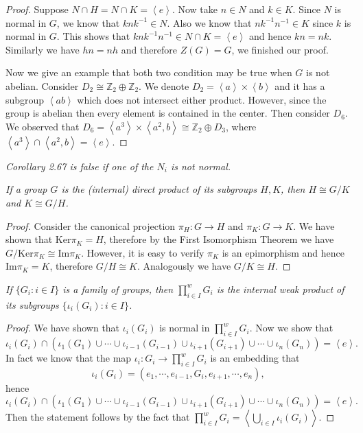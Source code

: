 \begin{proof}
Suppose $N\cap H=N\cap K=\left<e\right>$. Now take $n\in N$ and $k\in K$. Since $N$ is normal in $G$, we know that $knk^{-1}\in N$. Also we know that $nk^{-1}n^{-1}\in K$ since $k$ is normal in $G$. This shows that $knk^{-1}n^{-1}\in N\cap K=\left<e\right>$ and hence $kn=nk$. Similarly we have $hn=nh$ and therefore $Z(G)=G$, we finished our proof.\par
Now we give an example that both two condition may be true when $G$ is not abelian. Consider $D_2\cong\mathbb{Z}_2\oplus\mathbb{Z}_2$. We denote $D_2=\left<a\right>\times\left<b\right>$ and it has a subgroup $\left<ab\right>$ which does not intersect either product. However, since the group is abelian then every element is contained in the center. Then consider $D_6$. We observed that $D_6=\left<a^3\right>\times\left<a^2,b\right>\cong\mathbb{Z}_2\oplus D_3$, where $\left<a^3\right>\cap\left<a^2,b\right>=\left<e\right>$.
\end{proof}
\begin{problem}\em
Corollary 2.67 is false if one of the $N_i$ is not normal.
\end{problem}
\begin{problem}\em
If a group $G$ is the (internal) direct product of its subgroups $H,K$, then $H\cong G/K$ and $K\cong G/H$.
\end{problem}
\begin{proof}
Consider the canonical projection $\pi_H:G\to H$ and $\pi_K:G\to K$. We have shown that $\mathrm{Ker}\pi_K=H$, therefore by the First Isomorphism Theorem we have $G/\mathrm{Ker}\pi_K\cong\mathrm{Im}\pi_K$. However, it is easy to verify $\pi_K$ is an epimorphism and hence $\mathrm{Im}\pi_K=K$, therefore $G/H\cong K$. Analogously we have $G/K\cong H$.
\end{proof}
\begin{problem}\em
If $\{G_i:i\in I\}$ is a family of groups, then ${\prod}^w_{i\in I}G_i$ is the internal weak product of its subgroups $\{\iota_i(G_i):i\in I\}$.
\end{problem}
\begin{proof}
We have shown that $\iota_i(G_i)$ is normal in ${\prod}^w_{i\in I}G_i$. Now we show that 
$$
\iota _i\left( G_i \right) \cap \left( \iota _1\left( G_1 \right) \cup \cdots \cup \iota _{i-1}\left( G_{i-1} \right) \cup \iota _{i+1}\left( G_{i+1} \right) \cup \cdots \cup \iota _n\left( G_n \right) \right) =\left< e \right> .
$$
In fact we know that the map $\iota _i:G_i\rightarrow {\prod}^w_{i\in I}{G_i}$ is an embedding that 
$$\iota _i\left( G_i \right) =\left( e_1,\cdots ,e_{i-1},G_i,e_{i+1},\cdots ,e_n \right) ,$$
hence
$$
\iota _i\left( G_i \right) \cap \left( \iota _1\left( G_1 \right) \cup \cdots \cup \iota _{i-1}\left( G_{i-1} \right) \cup \iota _{i+1}\left( G_{i+1} \right) \cup \cdots \cup \iota _n\left( G_n \right) \right) =\left< e \right> .
$$
Then the statement follows by the fact that $
{\prod}^w_{i\in I}{G_i}=\left< \bigcup_{i\in I}{\iota _i\left( G_i \right)} \right> $.
\end{proof}
